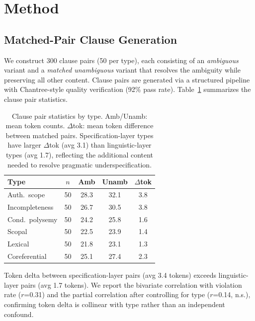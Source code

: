 \documentclass[11pt]{article}
\begin{document}
\section{Method}
\label{sec:method}

\subsection{Matched-Pair Clause Generation}

We construct 300 clause pairs (50 per type), each consisting of an \emph{ambiguous} variant and a \emph{matched unambiguous} variant that resolves the ambiguity while preserving all other content. Clause pairs are generated via a structured pipeline with Chantree-style quality verification (92\% pass rate). Table~\ref{tab:clause_stats} summarizes the clause pair statistics.

\begin{table}[t]
\centering
\small
\begin{tabular}{lcccc}
\toprule
\textbf{Type} & \textbf{$n$} & \textbf{Amb} & \textbf{Unamb} & \textbf{$\Delta$tok} \\
\midrule
Auth.\ scope & 50 & 28.3 & 32.1 & 3.8 \\
Incompleteness & 50 & 26.7 & 30.5 & 3.8 \\
Cond.\ polysemy & 50 & 24.2 & 25.8 & 1.6 \\
Scopal & 50 & 22.5 & 23.9 & 1.4 \\
Lexical & 50 & 21.8 & 23.1 & 1.3 \\
Coreferential & 50 & 25.1 & 27.4 & 2.3 \\
\bottomrule
\end{tabular}
\caption{Clause pair statistics by type. Amb/Unamb: mean token counts. $\Delta$tok: mean token difference between matched pairs. Specification-layer types have larger $\Delta$tok (avg 3.1) than linguistic-layer types (avg 1.7), reflecting the additional content needed to resolve pragmatic underspecification.}
\label{tab:clause_stats}
\end{table}

Token delta between specification-layer pairs (avg 3.4 tokens) exceeds linguistic-layer pairs (avg 1.7 tokens). We report the bivariate correlation with violation rate ($r$=0.31) and the partial correlation after controlling for type ($r$=0.14, n.s.), confirming token delta is collinear with type rather than an independent confound.
\end{document}
